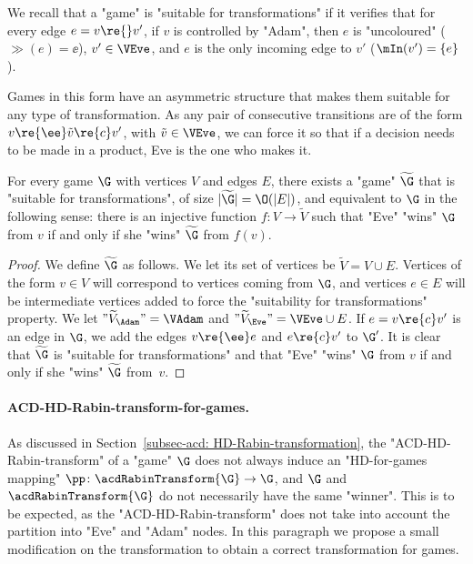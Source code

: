\documentclass{theoretics}
\begin{document}
We recall that a "game" is "suitable for transformations" if it verifies that for every edge $e = v\re{}v'$, if $v$ is controlled by "Adam", then $e$ is "uncoloured" ($\gg(e)=\ee$), $v'\in \VEve$, and $e$ is the only incoming edge to $v'$ ($\mIn(v') = \{e\}$). 

Games in this form have an asymmetric structure that makes them suitable for any type of transformation. As any pair of consecutive transitions are of the form $v\re{\ee}\tilde{v}\re{c}v'$, with $\tilde{v}\in \VEve$, we can force it so that if a decision needs to be made in a product, Eve is the one who makes it.


\begin{lemma}
	For every game $\G$ with vertices $V$ and edges $E$, there exists a "game" $\widetilde{\G}$ that is "suitable for transformations", of size $|\widetilde{\G}| = \O(|E|)$, and equivalent to $\G$ in the following sense: there is an injective function $f\colon V\to \widetilde{V}$ such that "Eve" "wins" $\G$ from  $v$ if and only if she "wins" $\widetilde{\G}$ from  $f(v)$.
\end{lemma}
 \begin{proof}
 	We define $\widetilde{\G}$ as follows. We let its set of vertices be $\widetilde{V} = V \cup E$. Vertices of the form $v\in V$ will correspond to vertices coming from $\G$, and vertices $e\in E$ will be intermediate vertices added to force the "suitability for transformations" property. We let $"\widetilde {V}_\Adam" = \VAdam $ and $"\widetilde {V}_\Eve" = \VEve \cup E$. If $e=v\re{c}v'$ is an edge in $\G$, we add the edges  $v\re{\ee} e$ and $e\re{c} v'$ to $\G'$. 
 	It is clear that $\widetilde{\G}$ is "suitable for transformations" and that "Eve" "wins" $\G$ from  $v$ if and only if she "wins" $\widetilde{\G}$ from~$v$.
 \end{proof}
 
\paragraph*{ACD-HD-Rabin-transform-for-games.}
As discussed in Section~\ref{subsec-acd: HD-Rabin-transformation}, the "ACD-HD-Rabin-transform" of a "game" $\G$ does not always induce an "HD-for-games mapping" $\pp\colon \acdRabinTransform{\G} \to \G$, and $\G$ and $\acdRabinTransform{\G}$ do not necessarily have the same "winner". This is to be expected, as the "ACD-HD-Rabin-transform" does not take into account the partition into "Eve" and "Adam" nodes. In this paragraph we propose a small modification on the transformation to obtain a correct transformation for games.
\end{document}
